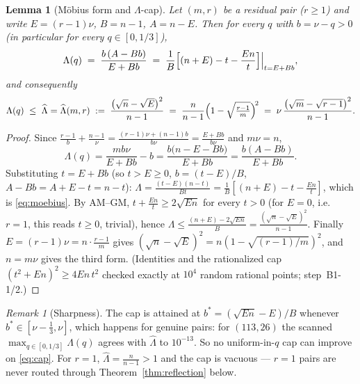 \documentclass[11pt]{amsart}
\newtheorem{lemma}[theorem]{Lemma}
\theoremstyle{remark}
\newtheorem{remark}[theorem]{Remark}
\newcommand{\Lhat}{\widehat\Lambda}
\begin{document}
\begin{lemma}[M\"obius form and $\Lambda$-cap]\label{lem:cap}
Let $(m,r)$ be a residual pair ($r\ge1$) and write $E=(r-1)\nu$, $B=n-1$, $A=n-E$.  Then for every $q$ with $b=\nu-q>0$ (in particular for every $q\in[0,1/3]$),
\begin{equation}\label{eq:moebius}
        \Lambda(q)\;=\;\frac{b\,(A-Bb)}{E+Bb}
        \;=\;\frac1B\Bigl[(n+E)-t-\frac{En}{t}\Bigr]
        \Big|_{t=E+Bb},
\end{equation}
and consequently
\begin{equation}\label{eq:cap}
        \Lambda(q)\;\le\;\Lhat=\Lhat(m,r)
        \;:=\;\frac{\bigl(\sqrt n-\sqrt E\bigr)^2}{n-1}
        \;=\;\frac{n}{n-1}\Bigl(1-\sqrt{\tfrac{r-1}{m}}\Bigr)^{\!2}
        \;=\;\nu\,\frac{\bigl(\sqrt m-\sqrt{r-1}\bigr)^2}{n-1}.
\end{equation}
\end{lemma}

\begin{proof}
Since $\frac{r-1}b+\frac{n-1}\nu=\frac{(r-1)\nu+(n-1)b}{b\nu}=\frac{E+Bb}{b\nu}$ and $m\nu=n$,
\[
        \Lambda(q)=\frac{mb\nu}{E+Bb}-b
        =\frac{b\bigl(n-E-Bb\bigr)}{E+Bb}
        =\frac{b(A-Bb)}{E+Bb}.
\]
Substituting $t=E+Bb$ (so $t>E\ge0$, $b=(t-E)/B$, $A-Bb=A+E-t=n-t$):
$\Lambda=\frac{(t-E)(n-t)}{Bt}=\frac1B[(n+E)-t-\frac{En}{t}]$, which is \eqref{eq:moebius}.  By AM--GM, $t+\frac{En}t\ge2\sqrt{En}$ for every $t>0$ (for $E=0$, i.e.\ $r=1$, this reads $t\ge0$, trivial), hence
$\Lambda\le\frac{(n+E)-2\sqrt{En}}{B}=\frac{(\sqrt n-\sqrt E)^2}{n-1}$.
Finally $E=(r-1)\nu=n\cdot\frac{r-1}m$ gives $(\sqrt n-\sqrt E)^2=n(1-\sqrt{(r-1)/m})^2$, and $n=m\nu$ gives the third form.  (Identities and the rationalized cap $(t^2+En)^2\ge4En\,t^2$ checked exactly at $10^4$ random rational points; step~B1-1/2.)
\end{proof}

\begin{remark}[Sharpness]\label{rmk:sharp}
The cap is attained at $b^*=(\sqrt{En}-E)/B$ whenever $b^*\in[\nu-\tfrac13,\nu]$, which happens for genuine pairs: for $(113,26)$ the scanned $\max_{q\in[0,1/3]}\Lambda(q)$ agrees with $\Lhat$ to $10^{-13}$.  So no uniform-in-$q$ cap can improve on \eqref{eq:cap}.  For $r=1$, $\Lhat=\frac n{n-1}>1$ and the cap is vacuous --- $r=1$ pairs are never routed through Theorem~\ref{thm:reflection} below.
\end{remark}
\end{document}
